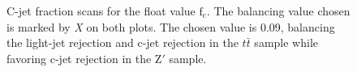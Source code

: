 \begin{figure}[h]
    \centering
    \qquad
    \caption{ C-jet fraction scans for the float value $\textrm{f}_{\textrm{c}}$. The balancing value chosen is marked by \textit{X} on both plots.
    The chosen value is 0.09, balancing the light-jet rejection and c-jet rejection in the $t\bar{t}$ sample while favoring c-jet rejection in the $\textrm{Z}'$ sample.}
\label{fig:cfrac}
\end{figure}

